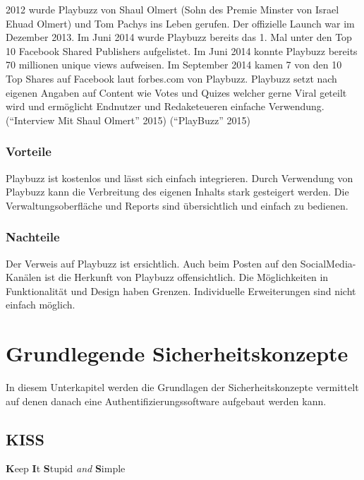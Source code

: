 2012 wurde Playbuzz von Shaul Olmert (Sohn des Premie Minster von Israel
Ehuad Olmert) und Tom Pachys ins Leben gerufen. Der offizielle Launch
war im Dezember 2013. Im Juni 2014 wurde Playbuzz bereits das 1. Mal
unter den Top 10 Facebook Shared Publishers aufgelistet. Im Juni 2014
konnte Playbuzz bereits 70 millionen unique views aufweisen. Im
September 2014 kamen 7 von den 10 Top Shares auf Facebook laut
forbes.com von Playbuzz. Playbuzz setzt nach eigenen Angaben auf Content
wie Votes und Quizes welcher gerne Viral geteilt wird und ermöglicht
Endnutzer und Redaketeueren einfache Verwendung. (``Interview Mit Shaul
Olmert'' 2015) (``PlayBuzz'' 2015)

\subsubsection{Vorteile}\label{vorteile-1}

Playbuzz ist kostenlos und lässt sich einfach integrieren. Durch
Verwendung von Playbuzz kann die Verbreitung des eigenen Inhalts stark
gesteigert werden. Die Verwaltungsoberfläche und Reports sind
übersichtlich und einfach zu bedienen.

\subsubsection{Nachteile}\label{nachteile-1}

Der Verweis auf Playbuzz ist ersichtlich. Auch beim Posten auf den
SocialMedia-Kanälen ist die Herkunft von Playbuzz offensichtlich. Die
Möglichkeiten in Funktionalität und Design haben Grenzen. Individuelle
Erweiterungen sind nicht einfach möglich.

\newpage

\section{Grundlegende
Sicherheitskonzepte}\label{grundlegende-sicherheitskonzepte}

In diesem Unterkapitel werden die Grundlagen der Sicherheitskonzepte
vermittelt auf denen danach eine Authentifizierungssoftware aufgebaut
werden kann.

\subsection{KISS}\label{kiss}

\textbf{K}eep \textbf{I}t \textbf{S}tupid \emph{and} \textbf{S}imple

